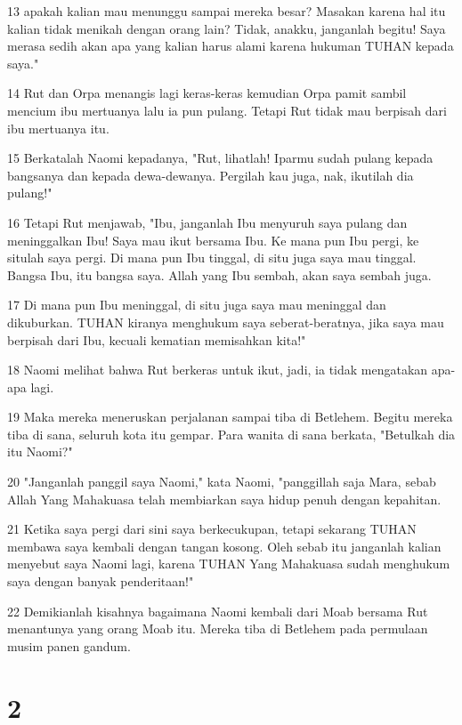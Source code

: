 \par 13 apakah kalian mau menunggu sampai mereka besar? Masakan karena hal itu kalian tidak menikah dengan orang lain? Tidak, anakku, janganlah begitu! Saya merasa sedih akan apa yang kalian harus alami karena hukuman TUHAN kepada saya."
\par 14 Rut dan Orpa menangis lagi keras-keras kemudian Orpa pamit sambil mencium ibu mertuanya lalu ia pun pulang. Tetapi Rut tidak mau berpisah dari ibu mertuanya itu.
\par 15 Berkatalah Naomi kepadanya, "Rut, lihatlah! Iparmu sudah pulang kepada bangsanya dan kepada dewa-dewanya. Pergilah kau juga, nak, ikutilah dia pulang!"
\par 16 Tetapi Rut menjawab, "Ibu, janganlah Ibu menyuruh saya pulang dan meninggalkan Ibu! Saya mau ikut bersama Ibu. Ke mana pun Ibu pergi, ke situlah saya pergi. Di mana pun Ibu tinggal, di situ juga saya mau tinggal. Bangsa Ibu, itu bangsa saya. Allah yang Ibu sembah, akan saya sembah juga.
\par 17 Di mana pun Ibu meninggal, di situ juga saya mau meninggal dan dikuburkan. TUHAN kiranya menghukum saya seberat-beratnya, jika saya mau berpisah dari Ibu, kecuali kematian memisahkan kita!"
\par 18 Naomi melihat bahwa Rut berkeras untuk ikut, jadi, ia tidak mengatakan apa-apa lagi.
\par 19 Maka mereka meneruskan perjalanan sampai tiba di Betlehem. Begitu mereka tiba di sana, seluruh kota itu gempar. Para wanita di sana berkata, "Betulkah dia itu Naomi?"
\par 20 "Janganlah panggil saya Naomi," kata Naomi, "panggillah saja Mara, sebab Allah Yang Mahakuasa telah membiarkan saya hidup penuh dengan kepahitan.
\par 21 Ketika saya pergi dari sini saya berkecukupan, tetapi sekarang TUHAN membawa saya kembali dengan tangan kosong. Oleh sebab itu janganlah kalian menyebut saya Naomi lagi, karena TUHAN Yang Mahakuasa sudah menghukum saya dengan banyak penderitaan!"
\par 22 Demikianlah kisahnya bagaimana Naomi kembali dari Moab bersama Rut menantunya yang orang Moab itu. Mereka tiba di Betlehem pada permulaan musim panen gandum.

\chapter{2}

